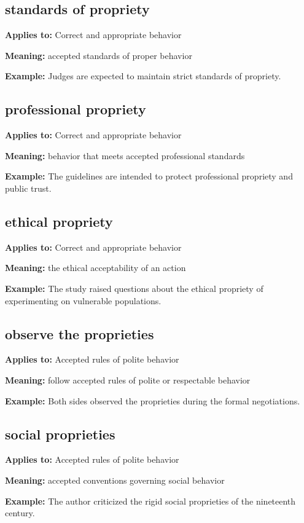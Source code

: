 \documentclass[11pt]{article}
\begin{document}
\subsection{standards of propriety}
\textbf{Applies to:} Correct and appropriate behavior

\textbf{Meaning:} accepted standards of proper behavior

\textbf{Example:} Judges are expected to maintain strict standards of propriety.

\subsection{professional propriety}
\textbf{Applies to:} Correct and appropriate behavior

\textbf{Meaning:} behavior that meets accepted professional standards

\textbf{Example:} The guidelines are intended to protect professional propriety and public trust.

\subsection{ethical propriety}
\textbf{Applies to:} Correct and appropriate behavior

\textbf{Meaning:} the ethical acceptability of an action

\textbf{Example:} The study raised questions about the ethical propriety of experimenting on vulnerable populations.

\subsection{observe the proprieties}
\textbf{Applies to:} Accepted rules of polite behavior

\textbf{Meaning:} follow accepted rules of polite or respectable behavior

\textbf{Example:} Both sides observed the proprieties during the formal negotiations.

\subsection{social proprieties}
\textbf{Applies to:} Accepted rules of polite behavior

\textbf{Meaning:} accepted conventions governing social behavior

\textbf{Example:} The author criticized the rigid social proprieties of the nineteenth century.
\end{document}
